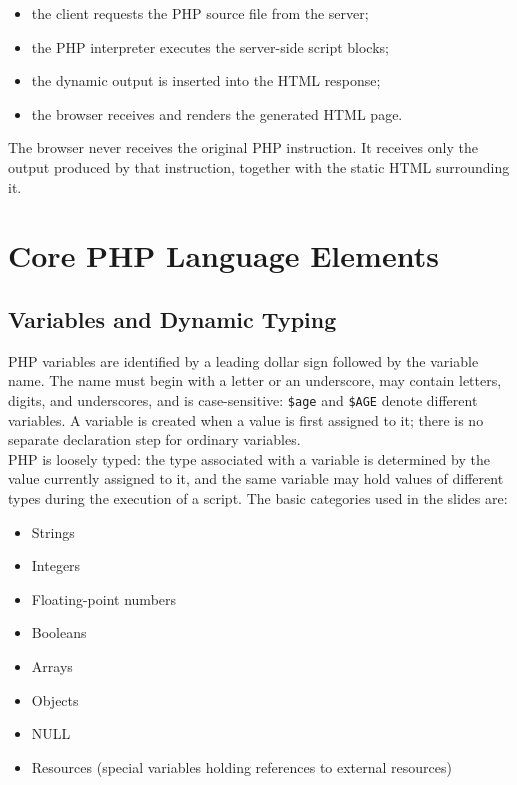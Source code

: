 \documentclass{scrbook}
\begin{document}
	\begin{itemize}
		\item the client requests the PHP source file from the server;
		\item the PHP interpreter executes the server-side script blocks;
		\item the dynamic output is inserted into the HTML response;
		\item the browser receives and renders the generated HTML page.
	\end{itemize}
	
	The browser never receives the original PHP instruction. It receives only the output produced by that instruction, together with the static HTML surrounding it.
	
	\chapter{Core PHP Language Elements}
	
	\section{Variables and Dynamic Typing}
	
	PHP variables are identified by a leading dollar sign followed by the variable name. The name must begin with a letter or an underscore, may contain letters, digits, and underscores, and is case-sensitive: \texttt{\$age} and \texttt{\$AGE} denote different variables. A variable is created when a value is first assigned to it; there is no separate declaration step for ordinary variables.\\
	
	PHP is loosely typed: the type associated with a variable is determined by the value currently assigned to it, and the same variable may hold values of different types during the execution of a script. The basic categories used in the slides are:
	\begin{itemize}
		\item Strings
		\item Integers
		\item Floating-point numbers
		\item Booleans
		\item Arrays
		\item Objects
		\item NULL
		\item Resources (special variables holding references to external resources)
	\end{itemize}
	
\end{document}
